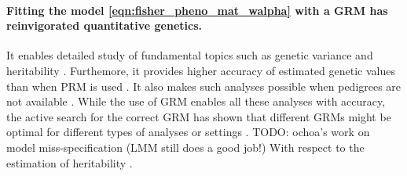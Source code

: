 


\paragraph{Fitting the model \eqref{eqn:fisher_pheno_mat_walpha} with a
GRM has reinvigorated quantitative genetics.}
%
It enables detailed study of fundamental topics such as
genetic variance and heritability
\citep{falconer1996introduction, visscher2008heritability}.
%
Furthemore, it provides higher accuracy of estimated genetic values
than when PRM is used
\citep{nejatijavaremi1997effect, meuwissen2001prediction, vanraden2008efficient}.
%
It also makes such analyses possible when pedigrees are not available
\citep[e.g.][]{bernardo1999marker, johnston2022taking}.
%
While the use of GRM enables all these analyses with accuracy, the active
search for the correct GRM has shown that different GRMs might be optimal
for different types of analyses or settings
\citep[e.g.][]{speed2015relatedness, legarra2016comparing, weir2018how, feldmann2022average}.
%
TODO: ochoa's work on model miss-specification (LMM still does a good job!)
\cite{ochoa2021estimating}
%
With respect to the estimation of heritability
\citep[e.g][]{shi2016contrasting, hou2019accurate, rawlik2020snp, lara2022temporal}.
%

